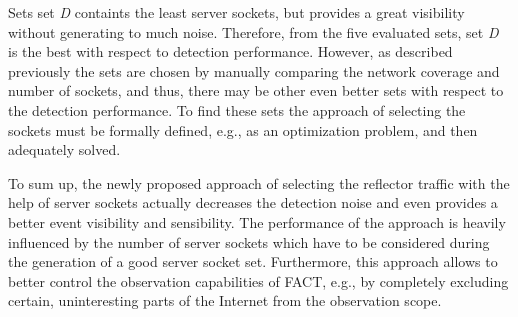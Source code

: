 Sets set \emph{D} containts the least \glspl{server socket}, but provides a great visibility without generating to much noise.
Therefore, from the five evaluated sets, set \emph{D} is the best with respect to detection performance. 
However, as described previously the sets are chosen by manually comparing the network coverage and number of sockets, and thus, there may be other even better sets with respect to the detection performance. 
To find these sets the approach of selecting the sockets must be formally defined, e.g., as an optimization problem, and then adequately solved.

To sum up, the newly proposed approach of selecting the reflector traffic with the help of \glspl{server socket} actually decreases the detection noise and even provides a better event visibility and sensibility.
The performance of the approach is heavily influenced by the number of \glspl{server socket} which have to be considered during the generation of a good \gls{server socket} set.
Furthermore, this approach allows to better control the observation capabilities of \gls{FACT}, e.g., by completely excluding certain, uninteresting parts of the Internet from the observation scope.